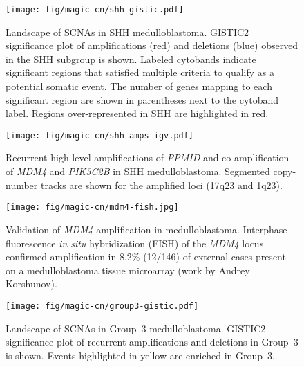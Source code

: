 \documentclass[11pt,letterpaper]{article}
\theoremstyle{definition}
\begin{document}
\clearpage

\begin{figure}[h]
	\begin{center}
		\texttt{[image: fig/magic-cn/shh-gistic.pdf]}
	\end{center}
	\caption[Landscape of SCNAs in SHH medulloblastoma]
	{
	Landscape of SCNAs in SHH medulloblastoma.
	GISTIC2 significance plot of amplifications (red) and deletions (blue) observed in the SHH subgroup is shown.
	Labeled cytobands indicate significant regions that satisfied multiple criteria to qualify as a potential somatic event. The number of genes mapping to each significant region are shown in parentheses next to the cytoband label.  Regions over-represented in SHH are highlighted in red.
	}
	\label{fig:shh-gistic}
\end{figure}

\clearpage

\begin{SCfigure}
	\centering
	\texttt{[image: fig/magic-cn/shh-amps-igv.pdf]}
	\caption[Recurrent amplifications of \emph{PPMID}, \emph{MDM4}, and \emph{PIK3C2B} in SHH medulloblastoma]
	{
	Recurrent high-level amplifications of \emph{PPMID} and co-amplification of \emph{MDM4} and \emph{PIK3C2B} in SHH medulloblastoma.
	Segmented copy-number tracks are shown for the amplified loci (17q23 and 1q23).
	}
	\label{fig:shh-amps-igv}
\end{SCfigure}

\begin{SCfigure}
	\centering
	\texttt{[image: fig/magic-cn/mdm4-fish.jpg]}
	\caption[Validation of \emph{MDM4} amplification in medulloblastoma]
	{
	Validation of \emph{MDM4} amplification in medulloblastoma.
	Interphase fluorescence \emph{in situ} hybridization (FISH) of the \emph{MDM4} locus confirmed amplification in 8.2\% (12/146) of external cases present on a medulloblastoma tissue microarray (work by Andrey Korshunov).
	}
	\label{fig:mdm4-fish}
\end{SCfigure}

\clearpage

\begin{figure}[h]
	\begin{center}
		\texttt{[image: fig/magic-cn/group3-gistic.pdf]}
	\end{center}
	\caption[Landscape of SCNAs in Group~3 medulloblastoma]
	{
	Landscape of SCNAs in Group~3 medulloblastoma.
	GISTIC2 significance plot of recurrent amplifications and deletions in Group~3 is shown. Events highlighted in yellow are enriched in Group~3.
	}
	\label{fig:group3-gistic}
\end{figure}
\end{document}
